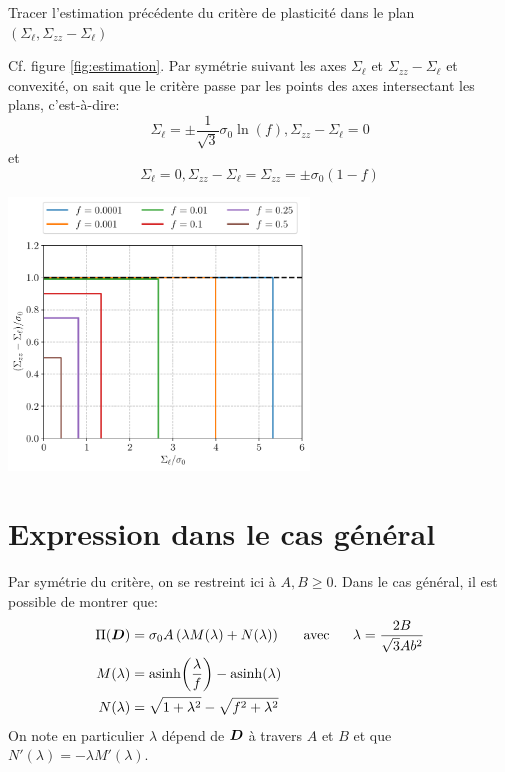 \documentclass[french,12pt]{exam}
\begin{document}
\begin{questions}
\question Tracer l'estimation précédente du critère de plasticité dans le plan $( \Sigma_\ell, \Sigma_{zz} - \Sigma_\ell )$\\
\begin{solution}
Cf. figure \ref{fig:estimation}. Par symétrie suivant les axes $\Sigma_\ell$ et $\Sigma_{zz}-\Sigma_\ell$ et convexité, on sait que le critère passe par les points des axes intersectant les plans, c'est-à-dire:
$$\Sigma_{\ell}=\pm\dfrac{1}{\sqrt{3}}\sigma_0 \ln(f), \Sigma_{zz}-\Sigma_\ell=0$$
et
$$\Sigma_{\ell}=0, \Sigma_{zz} -\Sigma_{\ell}=\Sigma_{zz} = \pm \sigma_0(1-f)$$
\begin{R_figure}
\includegraphics[width=0.6\textwidth]{Gurson_cylinder_approx}
\label{fig:estimation}
\end{R_figure}
\end{solution}
\end{questions}

\section{Expression dans le cas général}
Par symétrie du critère, on se restreint ici à $A, B\geq 0$. Dans le cas général, il est possible de montrer que:
  \begin{align}
    \Pi(\boldsymbol{D}) &= \sigma_0 A \left(\lambda M(\lambda)+N(\lambda)\right) \ \ \ \ \ \mathrm{avec} \ \ \ \ \ \lambda = \frac{2B}{\sqrt{3}Ab^2} \\
    M(\lambda) &=\mathrm{asinh}{\left( \frac{\lambda}{f} \right)} -\mathrm{asinh}{\left( \lambda \right)}\\
    N(\lambda) &= \sqrt{1 + \lambda^2} - \sqrt{f^2 + \lambda^2}
  \end{align}
On note en particulier $\lambda$ dépend de $\boldsymbol{D}$ à travers $A$ et $B$ et que $\boxed{N'(\lambda)= -\lambda M'(\lambda)}$.
\end{document}
